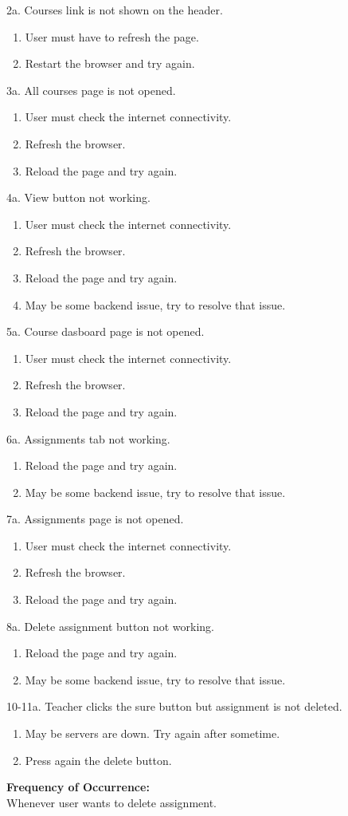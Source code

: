 \documentclass[12pt]{article}
\begin{document}
2a. Courses link is not shown on the header.
\begin{enumerate}
\item User must have to refresh the page.
\item Restart the browser and try again.
\end{enumerate} 
3a. All courses page is not opened.
\begin{enumerate}
\item User must check the internet connectivity.
\item Refresh the browser.
\item Reload the page and try again.
\end{enumerate}
4a. View button not working.
\begin{enumerate}
\item User must check the internet connectivity.
\item Refresh the browser.
\item Reload the page and try again.
\item May be some backend issue, try to resolve that issue.
\end{enumerate}
5a. Course dasboard page is not opened.
\begin{enumerate}
\item User must check the internet connectivity.
\item Refresh the browser.
\item Reload the page and try again.
\end{enumerate}
6a. Assignments tab not working.
\begin{enumerate}
\item Reload the page and try again.
\item May be some backend issue, try to resolve that issue.
\end{enumerate}
7a. Assignments page is not opened.
\begin{enumerate}
\item User must check the internet connectivity.
\item Refresh the browser.
\item Reload the page and try again.
\end{enumerate}
8a. Delete assignment button not working.
\begin{enumerate}
\item Reload the page and try again.
\item May be some backend issue, try to resolve that issue.
\end{enumerate}
10-11a. Teacher clicks the sure button but assignment is not deleted.
\begin{enumerate}
\item May be servers are down. Try again after sometime.
\item Press again the delete button.
\end{enumerate}
\textbf{Frequency of Occurrence:}\\
Whenever user wants to delete assignment.
\end{document}
